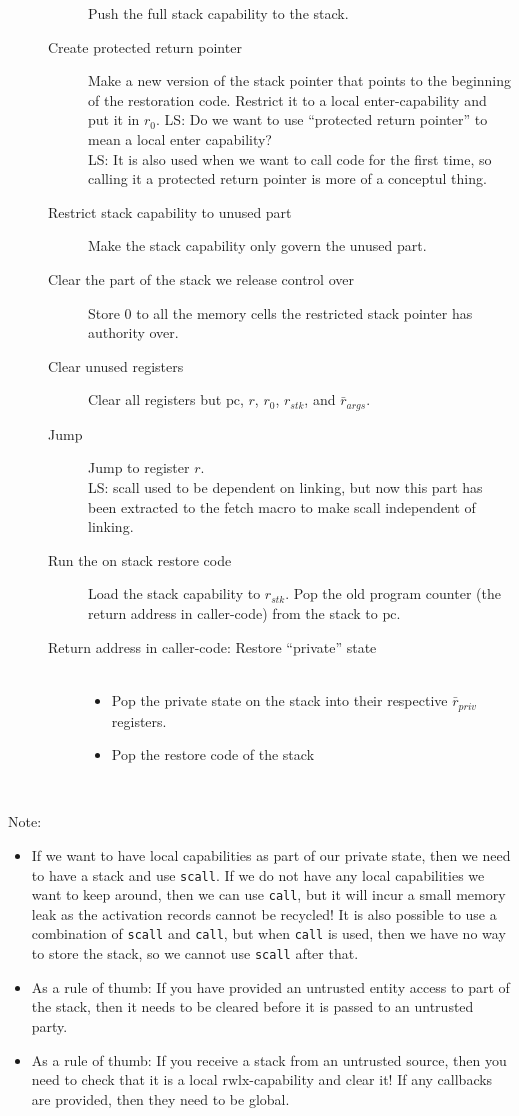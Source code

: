 \documentclass[a4paper]{article}
\newcommand{\forcenewline}{$\phantom{v}$\\}
\newcommand\lau[1]{{\color{purple} \sf \footnotesize {LS: #1}}\\}
\newcommand{\var}[1]{\mathit{#1}}
\newcommand{\pcreg}{\mathrm{pc}}
\newcommand{\plainperm}[1]{\mathrm{#1}}
\newcommand{\rwlx}{\plainperm{rwlx}}
\begin{document}
\begin{description}
\begin{description}
    Push the full stack capability to the stack.
  \item [Create protected return pointer]
    Make a new version of the stack pointer that points to the beginning of the restoration code. Restrict it to a local enter-capability and put it in $r_0$. \lau{Do we want to use ``protected return pointer'' to mean a local enter capability?} \lau{It is also used when we want to call code for the first time, so calling it a protected return pointer is more of a conceptul thing.}
  \item [Restrict stack capability to unused part]
    Make the stack capability only govern the unused part.
  \item [Clear the part of the stack we release control over]
    Store 0 to all the memory cells the restricted stack pointer has authority over.
  \item [Clear unused registers]
    Clear all registers but $\pcreg$, $r$, $r_0$, $r_{\var{stk}}$, and $\bar{r}_{\var{args}}$.
  \item [Jump] Jump to register $r$.
    \\ \lau{scall used to be dependent on linking, but now this part has been extracted to the fetch macro to make scall independent of linking.}
  \item [Run the on stack restore code]
    Load the stack capability to $r_{\var{stk}}$. Pop the old program counter (the return address in caller-code) from the stack to $\pcreg$.
  \item [Return address in caller-code: Restore ``private'' state] \forcenewline
    \begin{itemize}
    \item Pop the private state on the stack into their respective $\bar{r}_{\var{priv}}$ registers.
    \item Pop the restore code of the stack
    \end{itemize}\
  \end{description}
\end{description}
Note:
\begin{itemize}
\item If we want to have local capabilities as part of our private state, then we need to have a stack and use \texttt{scall}. If we do not have any local capabilities we want to keep around, then we can use \texttt{call}, but it will incur a small memory leak as the activation records cannot be recycled! It is also possible to use a combination of \texttt{scall} and \texttt{call}, but when \texttt{call} is used, then we have no way to store the stack, so we cannot use \texttt{scall} after that.
\item As a rule of thumb: If you have provided an untrusted entity access to part of the stack, then it needs to be cleared before it is passed to an untrusted party.
\item As a rule of thumb: If you receive a stack from an untrusted source, then you need to check that it is a local $\rwlx$-capability and clear it! If any callbacks are provided, then they need to be global.
\end{itemize}
\end{document}
